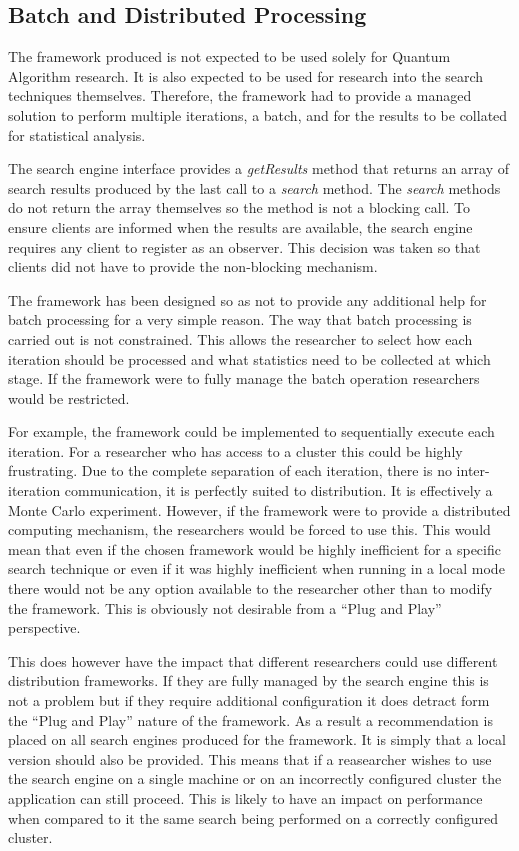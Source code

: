 \subsection{Batch and Distributed Processing}
The framework produced is not expected to be used solely for Quantum Algorithm research.
It is also expected to be used for research into the search techniques themselves.
Therefore, the framework had to provide a managed solution to perform multiple iterations, a batch, and for the results to be collated for statistical analysis.

The search engine interface provides a \emph{getResults} method that returns an array of search results produced by the last call to a \emph{search} method.
The \emph{search} methods do not return the array themselves so the method is not a blocking call.
To ensure clients are informed when the results are available, the search engine requires any client to register as an observer.
This decision was taken so that clients did not have to provide the non-blocking mechanism.

The framework has been designed so as not to provide any additional help for batch processing for a very simple reason.
The way that batch processing is carried out is not constrained.
This allows the researcher to select how each iteration should be processed and what statistics need to be collected at which stage.
If the framework were to fully manage the batch operation researchers would be restricted.

For example, the framework could be implemented to sequentially execute each iteration.
For a researcher who has access to a cluster this could be highly frustrating.
Due to the complete separation of each iteration, there is no inter-iteration communication, it is perfectly suited to distribution.
It is effectively a Monte Carlo experiment.
However, if the framework were to provide a distributed computing mechanism, the researchers would be forced to use this.
This would mean that even if the chosen framework would be highly inefficient for a specific search technique or even if it was highly inefficient when running in a local mode there would not be any option available to the researcher other than to modify the framework.
This is obviously not desirable from a ``Plug and Play'' perspective.

This does however have the impact that different researchers could use different distribution frameworks.
If they are fully managed by the search engine this is not a problem but if they require additional configuration it does detract form the ``Plug and Play'' nature of the framework.
As a result a recommendation is placed on all search engines produced for the framework.
It is simply that a local version should also be provided.
This means that if a reasearcher wishes to use the search engine on a single machine or on an incorrectly configured cluster the application can still proceed.
This is likely to have an impact on performance when compared to it the same search being performed on a correctly configured cluster.

